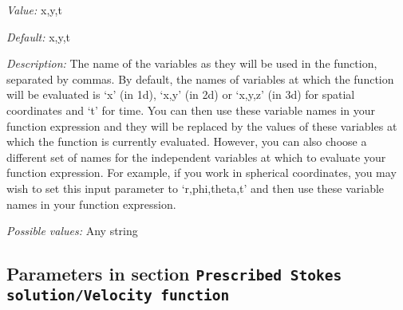 \begin{itemize}
{\it Value:} x,y,t


{\it Default:} x,y,t


{\it Description:} The name of the variables as they will be used in the function, separated by commas. By default, the names of variables at which the function will be evaluated is `x' (in 1d), `x,y' (in 2d) or `x,y,z' (in 3d) for spatial coordinates and `t' for time. You can then use these variable names in your function expression and they will be replaced by the values of these variables at which the function is currently evaluated. However, you can also choose a different set of names for the independent variables at which to evaluate your function expression. For example, if you work in spherical coordinates, you may wish to set this input parameter to `r,phi,theta,t' and then use these variable names in your function expression.


{\it Possible values:} Any string
\end{itemize}

\subsection{Parameters in section \tt Prescribed Stokes solution/Velocity function}
\label{parameters:Prescribed_20Stokes_20solution/Velocity_20function}

